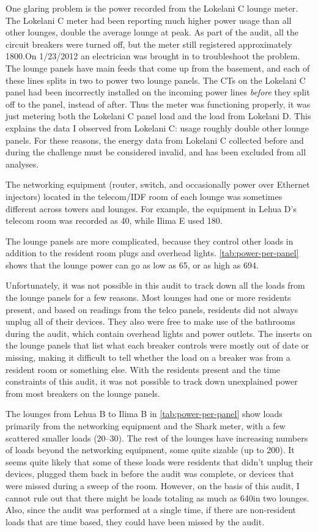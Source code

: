 \label{par:lokelani-c}
One glaring problem is the power recorded from the Lokelani C lounge meter. The Lokelani C meter had been reporting much higher power usage than all other lounges, double the average lounge at peak. As part of the audit, all the circuit breakers were turned off, but the meter still registered approximately 1800\W.\@ On 1/23/2012 an electrician was brought in to troubleshoot the problem. The lounge panels have main feeds that come up from the basement, and each of these lines splits in two to power two lounge panels. The CTs on the Lokelani C panel had been incorrectly installed on the incoming power lines \emph{before} they split off to the panel, instead of after. Thus the meter was functioning properly, it was just metering both the Lokelani C panel load and the load from Lokelani D. This explains the data I observed from Lokelani C: usage roughly double other lounge panels. For these reasons, the energy data from Lokelani C collected before and during the challenge must be considered invalid, and has been excluded from all analyses.

The networking equipment (router, switch, and occasionally power over Ethernet injectors) located in the telecom/IDF room of each lounge was sometimes different across towers and lounges. For example, the equipment in Lehua D's telecom room was recorded as 40\W, while Ilima E used 180\W.

The lounge panels are more complicated, because they control other loads in addition to the resident room plugs and overhead lights. \autoref{tab:power-per-panel} shows that the lounge power can go as low as 65\W, or as high as 694\W.

Unfortunately, it was not possible in this audit to track down all the loads from the lounge panels for a few reasons. Most lounges had one or more residents present, and based on readings from the telco panels, residents did not always unplug all of their devices. They also were free to make use of the bathrooms during the audit, which contain overhead lights and power outlets. The inserts on the lounge panels that list what each breaker controls were mostly out of date or missing, making it difficult to tell whether the load on a breaker was from a resident room or something else. With the residents present and the time constraints of this audit, it was not possible to track down unexplained power from most breakers on the lounge panels.

The lounges from Lehua B to Ilima B in \autoref{tab:power-per-panel} show loads primarily from the networking equipment and the Shark meter, with a few scattered smaller loads (20--30\W). The rest of the lounges have increasing numbers of loads beyond the networking equipment, some quite sizable (up to 200\W). It seems quite likely that some of these loads were residents that didn't unplug their devices, plugged them back in before the audit was complete, or devices that were missed during a sweep of the room. However, on the basis of this audit, I cannot rule out that there might be loads totaling as much as 640\W in two lounges. Also, since the audit was performed at a single time, if there are non-resident loads that are time based, they could have been missed by the audit.

